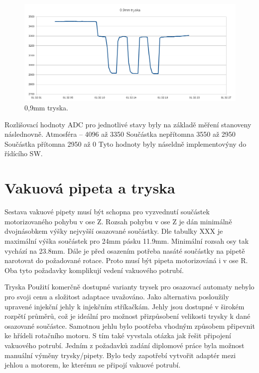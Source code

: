 \begin{figure}[h!]
  \centering
    \includegraphics[width=0.9\linewidth]{obrazky/09mm_graf.png}%
    \caption{0,9mm tryska.}
    \label{fig:sensor}
\end{figure}


Rozlišovací hodnoty ADC pro jednotlivé stavy byly na základě měření stanoveny následnovně.
Atmosféra – 4096 až 3350
Součástka nepřítomna 3550 až 2950
Součástka přítomna 2950 až 0
Tyto hodnoty byly náseldně implementovýny do řídícího SW.


\section{Vakuová pipeta a tryska}
Sestava vakuové pipety musí být schopna pro vyzvednutí součástek motorizovaného pohybu v ose Z. Rozsah pohybu v ose Z je dán minimálně dvojnásobkem výšky nejvyšší osazované součástky. Dle tabulky XXX je maximální výška součástek pro 24mm pásku 11.9mm. Minimální rozsah osy tak vychází na 23.8mm. Dále je před osazením potřeba nasáté součástky na pipetě narotovat do požadované rotace. Proto musí být pipeta motorizováná i v ose R. Oba tyto požadavky komplikují vedení vakuového potrubí.

Tryska
Použití komerčně dostupné varianty trysek pro osazovací automaty nebylo pro svoji cenu a složitost adaptace uvažováno. Jako alternativa posloužily upravené injekční jehly k injekčním stříkačkám. Jehly jsou dostupné v širokém rozpětí průměrů, což je ideální pro možnost přizpůsobení velikosti trysky k dané osazované součástce. Samotnou jehlu bylo pootřeba vhodným způsobem připevnit ke hřídeli rotačního motoru. S tím také vyvstala otázka jak řešit připojení vakuového potrubí. 
Jedním z požadavků zadání diplomové práce byla možnost manuální výměny trysky/pipety. Bylo tedy zapotřebí vytvořit adaptér mezi jehlou a motorem, ke kterému se připojí vakuové potrubí.



